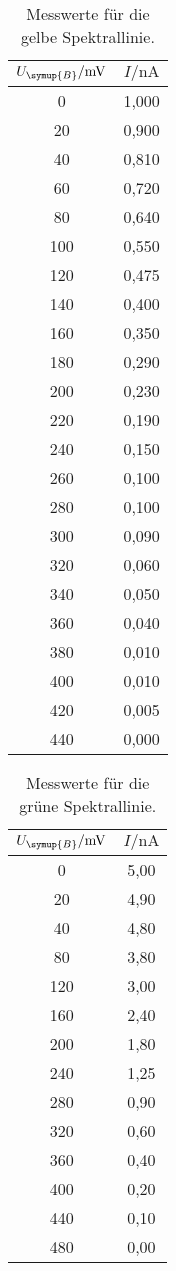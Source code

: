 \begin{table}[!hbt]
    \centering
    \caption{Messwerte für die gelbe Spektrallinie.}
    \label{tab:gelb}
    \begin{tabular}{c c}
        \toprule
        $U_{\symup{B}} / \unit{\milli\volt}$ & $I / \unit{\nano\ampere}$ \\
        \midrule
         0 & 1,000 \\
        20 & 0,900 \\
        40 & 0,810 \\
        60 & 0,720 \\
        80 & 0,640 \\
       100 & 0,550 \\
       120 & 0,475 \\
       140 & 0,400 \\
       160 & 0,350 \\
       180 & 0,290 \\
       200 & 0,230 \\
       220 & 0,190 \\
       240 & 0,150 \\
       260 & 0,100 \\
       280 & 0,100 \\
       300 & 0,090 \\
       320 & 0,060 \\
       340 & 0,050 \\
       360 & 0,040 \\
       380 & 0,010 \\
       400 & 0,010 \\
       420 & 0,005 \\
       440 & 0,000 \\
        \bottomrule
    \end{tabular}
\end{table}

\begin{table}[!hbt]
    \centering
    \caption{Messwerte für die grüne Spektrallinie.}
    \label{tab:gruen}
    \begin{tabular}{c c}
        \toprule
        $U_{\symup{B}} / \unit{\milli\volt}$ & $I / \unit{\nano\ampere}$ \\
        \midrule
          0 & 5,00 \\
         20 & 4,90 \\
         40 & 4,80 \\
         80 & 3,80 \\
        120 & 3,00 \\
        160 & 2,40 \\
        200 & 1,80 \\
        240 & 1,25 \\
        280 & 0,90 \\
        320 & 0,60 \\
        360 & 0,40 \\
        400 & 0,20 \\
        440 & 0,10 \\
        480 & 0,00 \\
        \bottomrule
    \end{tabular}
\end{table}

